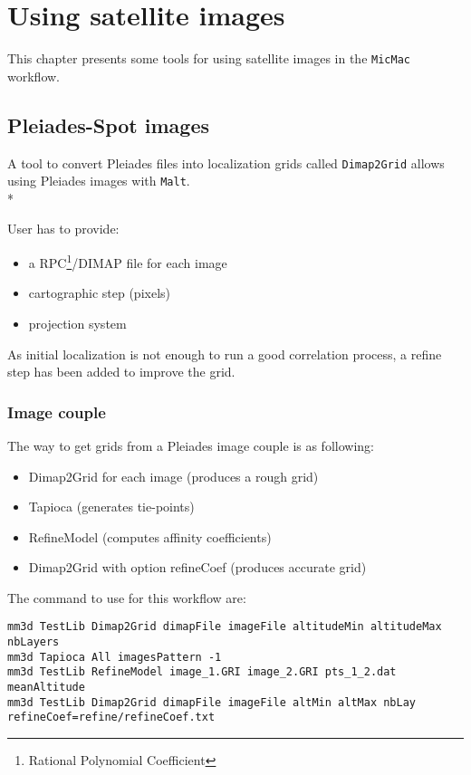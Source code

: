 \chapter{Using satellite images}

This chapter presents some tools for using satellite images in the {\tt MicMac} workflow.

\section{Pleiades-Spot images}

A tool to convert Pleiades files into localization grids called {\tt Dimap2Grid} allows using Pleiades images with {\tt Malt}.\\*

User has to provide:
\begin{itemize}
\item a RPC\footnote{Rational Polynomial Coefficient}/DIMAP file for each image
\item cartographic step (pixels)
\item projection system
\end{itemize}

As initial localization is not enough to run a good correlation process, a refine step has been added to improve the grid.

\subsection{Image couple}

The way to get grids from a Pleiades image couple is as following:

\begin{itemize}
\item Dimap2Grid for each image (produces a rough grid)
\item Tapioca (generates tie-points)
\item RefineModel (computes affinity coefficients)
\item Dimap2Grid with option refineCoef (produces accurate grid)
\end{itemize}

The command to use for this workflow are:
\begin{verbatim}
mm3d TestLib Dimap2Grid dimapFile imageFile altitudeMin altitudeMax nbLayers
mm3d Tapioca All imagesPattern -1
mm3d TestLib RefineModel image_1.GRI image_2.GRI pts_1_2.dat meanAltitude
mm3d TestLib Dimap2Grid dimapFile imageFile altMin altMax nbLay refineCoef=refine/refineCoef.txt
\end{verbatim}

